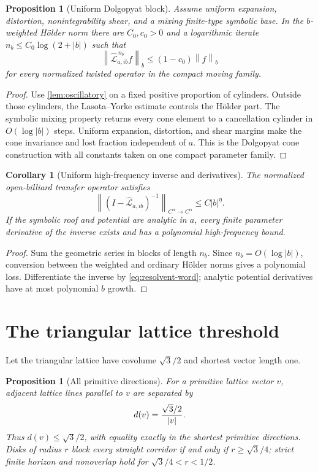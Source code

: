 \documentclass[11pt,reqno]{amsart}
\newtheorem{proposition}[theorem]{Proposition}
\newtheorem{corollary}[theorem]{Corollary}
\theoremstyle{definition}
\theoremstyle{remark}
\newcommand{\norm}[1]{\left\lVert#1\right\rVert}
\newcommand{\abs}[1]{\left\lvert#1\right\rvert}
\begin{document}
\begin{proposition}[Uniform Dolgopyat block]\label{prop:Dolgopyat-block}
Assume uniform expansion, distortion, nonintegrability shear, and a mixing
finite-type symbolic base.  In the $b$-weighted Hölder norm there are
$C_0,c_0>0$ and a logarithmic iterate
$n_b\le C_0\log(2+\abs b)$ such that
\[
 \norm{\widehat{\mathscr L}_{a,ib}^{\,n_b}f}_b
 \le(1-c_0)\norm f_b
\]
for every normalized twisted operator in the compact moving family.
\end{proposition}

\begin{proof}
Use \cref{lem:oscillatory} on a fixed positive proportion of cylinders.
Outside those cylinders, the Lasota--Yorke estimate controls the Hölder part.
The symbolic mixing property returns every cone element to a cancellation
cylinder in $O(\log\abs b)$ steps.  Uniform expansion, distortion, and shear
margins make the cone invariance and lost fraction independent of $a$.  This is
the Dolgopyat cone construction with all constants taken on one compact
parameter family.
\end{proof}

\begin{corollary}[Uniform high-frequency inverse and derivatives]
The normalized open-billiard transfer operator satisfies
\[
 \norm{(I-\widehat{\mathscr L}_{a,ib})^{-1}}_{C^\alpha\to C^\alpha}
 \le C\abs b^\eta.
\]
If the symbolic roof and potential are analytic in $a$, every finite parameter
derivative of the inverse exists and has a polynomial high-frequency bound.
\end{corollary}

\begin{proof}
Sum the geometric series in blocks of length $n_b$.  Since
$n_b=O(\log\abs b)$, conversion between the weighted and ordinary Hölder norms
gives a polynomial loss.  Differentiate the inverse by
\eqref{eq:resolvent-word}; analytic potential derivatives have at most
polynomial $b$ growth.
\end{proof}

\section{The triangular lattice threshold}

Let the triangular lattice have covolume $\sqrt3/2$ and shortest vector length
one.

\begin{proposition}[All primitive directions]
For a primitive lattice vector $v$, adjacent lattice lines parallel to $v$ are
separated by
\[
 d(v)={\sqrt3/2\over\abs v}.
\]
Thus $d(v)\le\sqrt3/2$, with equality exactly in the shortest primitive
directions.  Disks of radius $r$ block every straight corridor if and only if
$r\ge\sqrt3/4$; strict finite horizon and nonoverlap hold for
$\sqrt3/4<r<1/2$.
\end{proposition}
\end{document}
